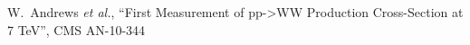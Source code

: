 \begin{thebibliography}{99}                                                                                                                               

  W.~Andrews {\it et al.}, ``First Measurement of pp->WW Production Cross-Section at 7 TeV'',
  CMS AN-10-344

\end{thebibliography}


